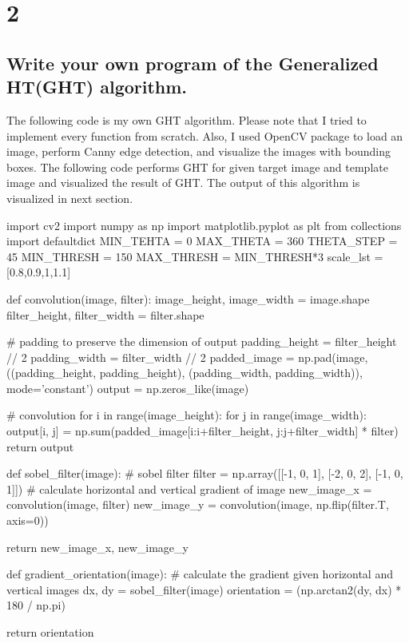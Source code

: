 \documentclass[10pt]{article}
\begin{document}
\section*{2}
\subsection*{Write your own program of the Generalized HT(GHT) algorithm.}
The following code is my own GHT algorithm. Please note that I tried to implement every function from scratch. 
Also, I used OpenCV package to load an image, perform Canny edge detection, and visualize the images with bounding boxes. 
The following code performs GHT for given target image and template image and visualized the result of GHT.
The output of this algorithm is visualized in next section.

\begin{python}
import cv2
import numpy as np
import matplotlib.pyplot as plt
from collections import defaultdict
MIN_TEHTA = 0
MAX_THETA = 360
THETA_STEP = 45
MIN_THRESH = 150
MAX_THRESH = MIN_THRESH*3
scale_lst = [0.8,0.9,1,1.1]

def convolution(image, filter):
    image_height, image_width = image.shape
    filter_height, filter_width = filter.shape

    # padding to preserve the dimension of output
    padding_height = filter_height // 2
    padding_width = filter_width // 2
    padded_image = np.pad(image, ((padding_height, padding_height), (padding_width, padding_width)), mode='constant')
    output = np.zeros_like(image)

    # convolution
    for i in range(image_height):
        for j in range(image_width):
            output[i, j] = np.sum(padded_image[i:i+filter_height, j:j+filter_width] * filter)
    return output

def sobel_filter(image):
    # sobel filter
    filter = np.array([[-1, 0, 1], [-2, 0, 2], [-1, 0, 1]])
    # calculate horizontal and vertical gradient of image
    new_image_x = convolution(image, filter)
    new_image_y = convolution(image, np.flip(filter.T, axis=0))

    return new_image_x, new_image_y

def gradient_orientation(image):
    # calculate the gradient given horizontal and vertical images
    dx, dy = sobel_filter(image)
    orientation = (np.arctan2(dy, dx) * 180 / np.pi) %

    return orientation


\end{python}
\end{document}
